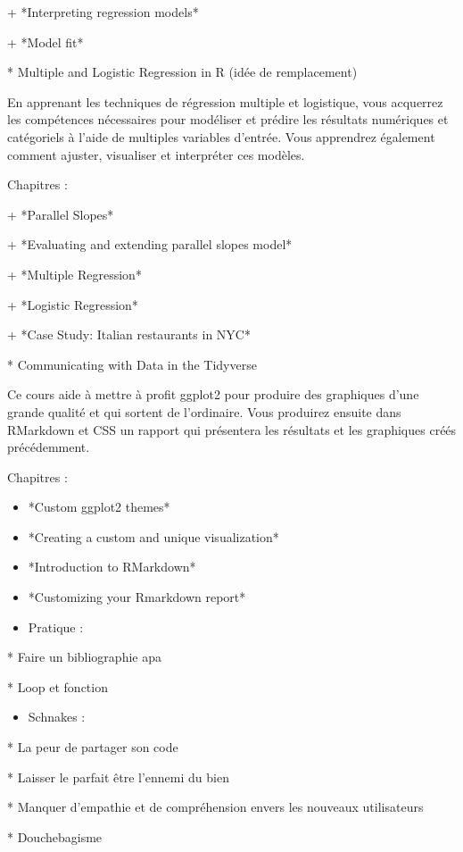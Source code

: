 \documentclass[
  letterpaper,
]{scrbook}
\providecommand{\tightlist}{%
  \setlength{\itemsep}{0pt}\setlength{\parskip}{0pt}}\usepackage{longtable,booktabs,array}
\begin{document}
+ *Interpreting regression models*

+ *Model fit*

* Multiple and Logistic Regression in R (idée de remplacement)

En apprenant les techniques de régression multiple et logistique, vous
acquerrez les compétences nécessaires pour modéliser et prédire les
résultats numériques et catégoriels à l'aide de multiples variables
d'entrée. Vous apprendrez également comment ajuster, visualiser et
interpréter ces modèles.

Chapitres :

+ *Parallel Slopes*

+ *Evaluating and extending parallel slopes model*

+ *Multiple Regression*

+ *Logistic Regression*

+ *Case Study: Italian restaurants in NYC*

* Communicating with Data in the Tidyverse

Ce cours aide à mettre à profit ggplot2 pour produire des graphiques
d'une grande qualité et qui sortent de l'ordinaire. Vous produirez
ensuite dans RMarkdown et CSS un rapport qui présentera les résultats et
les graphiques créés précédemment.

Chapitres :

\begin{itemize}
\item
  *Custom ggplot2 themes*
\item
  *Creating a custom and unique visualization*
\item
  *Introduction to RMarkdown*
\item
  *Customizing your Rmarkdown report*
\item
  Pratique :
\end{itemize}

* Faire un bibliographie apa

* Loop et fonction

\begin{itemize}
\tightlist
\item
  Schnakes :
\end{itemize}

* La peur de partager son code

* Laisser le parfait être l'ennemi du bien

* Manquer d'empathie et de compréhension envers les nouveaux
utilisateurs

* Douchebagisme
\end{document}
